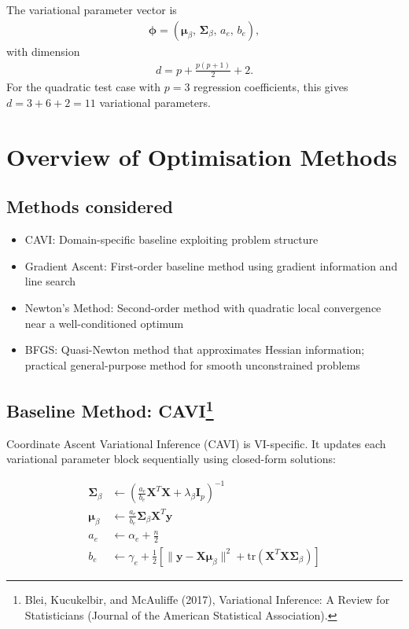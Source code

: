 \documentclass[11pt,a4paper]{article}
\newcommand{\tr}{\text{tr}}
\begin{document}
The variational parameter vector is
\begin{align}
\bm{\phi} = (\bm{\mu}_\beta,\, \bm{\Sigma}_\beta,\, a_e,\, b_e),
\end{align}
with dimension
\begin{align}
d = p + \frac{p(p+1)}{2} + 2.
\end{align}
For the quadratic test case with $p=3$ regression coefficients, this gives $d = 3 + 6 + 2 = 11$ variational parameters.
 
\section*{Overview of Optimisation Methods}

\subsection*{Methods considered}

\begin{itemize}
\item CAVI: Domain-specific baseline exploiting problem structure
\item Gradient Ascent: First-order baseline method using gradient information and line search
\item Newton's Method: Second-order method with quadratic local convergence near a well-conditioned optimum
\item BFGS: Quasi-Newton method that approximates Hessian information; practical general-purpose method for smooth unconstrained problems
\end{itemize}

\subsection*{Baseline Method: CAVI\footnote{Blei, Kucukelbir, and McAuliffe (2017), Variational Inference: A Review for Statisticians (Journal of the American Statistical Association).}}

Coordinate Ascent Variational Inference (CAVI) is VI-specific. It updates each variational parameter block sequentially using closed-form solutions:

\begin{align}
\bm{\Sigma}_\beta &\leftarrow \left(\frac{a_e}{b_e} \bm{X}^T\bm{X} + \lambda_\beta \bm{I}_p\right)^{-1}\\
\bm{\mu}_\beta &\leftarrow \frac{a_e}{b_e} \bm{\Sigma}_\beta \bm{X}^T\bm{y}\\
a_e &\leftarrow \alpha_e + \frac{n}{2}\\
b_e &\leftarrow \gamma_e + \frac{1}{2}\left[\|\bm{y} - \bm{X}\bm{\mu}_\beta\|^2 + \tr(\bm{X}^T\bm{X}\bm{\Sigma}_\beta)\right]
\end{align}
\end{document}
